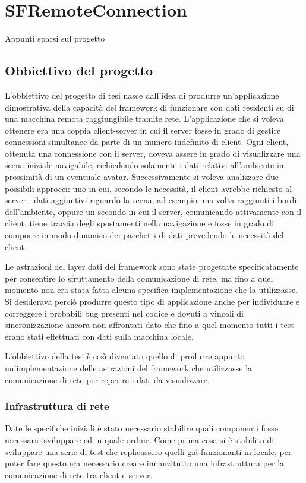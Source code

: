 
\chapter{SFRemoteConnection}
\label{ch:sfremoteconnection}
Appunti sparsi sul progetto

\section{Obbiettivo del progetto}
\label{sec:obbiettivo}
L'obbiettivo del progetto di tesi nasce dall'idea di produrre un'applicazione dimostrativa della capacit\`a del framework di funzionare con dati residenti su di una macchina remota raggiungibile tramite rete.
L'applicazione che si voleva ottenere era una coppia client-server in cui il server fosse in grado di gestire connessioni simultanee da parte di un numero indefinito di client. 
Ogni client, ottenuta una connessione con il server, doveva assere in grado di visualizzare una scena iniziale navigabile, richiedendo solamente i dati relativi all'ambiente in prossimit\`a di un eventuale avatar.
Successivamente si voleva analizzare due possibili approcci: uno in cui, secondo le necessit\`a, il client avrebbe richiesto al server i dati aggiuntivi riguardo la scena, ad esempio una volta raggiunti i bordi dell'ambiente, oppure un secondo in cui il server, comunicando attivamente con il client, tiene traccia degli spostamenti nella navigazione e fosse in grado di comporre in modo dinamico dei pacchetti di dati prevedendo le necessit\`a del client.

Le astrazioni del layer dati del framework sono state progettate specificatamente per consentire lo sfruttamento della comunicazione di rete, ma fino a quel momento non era stata fatta alcuna specifica implementazione che la utilizzasse. Si desiderava perci\`o produrre questo tipo di applicazione anche per individuare e correggere i probabili bug presenti nel codice e dovuti a vincoli di sincronizzazione ancora non affrontati dato che fino a quel momento tutti i test erano stati effettuati con dati sulla macchina locale.

L'obbiettivo della tesi \`e cos{\`\i} diventato quello di produrre appunto un'implementazione delle astrazioni del framework che utilizzasse la comunicazione di rete per reperire i dati da visualizzare.

\subsection{Infrastruttura di rete} 
\label{sub:rete}
Date le specifiche iniziali \`e stato necessario stabilire quali componenti fosse necessario sviluppare ed in quale ordine. 
Come prima cosa si \`e stabilito di sviluppare una serie di test che replicassero quelli gi\`a funzionanti in locale, per poter fare questo era necessario creare innanzitutto una infrastruttura per la comunicazione di rete tra client e server.

